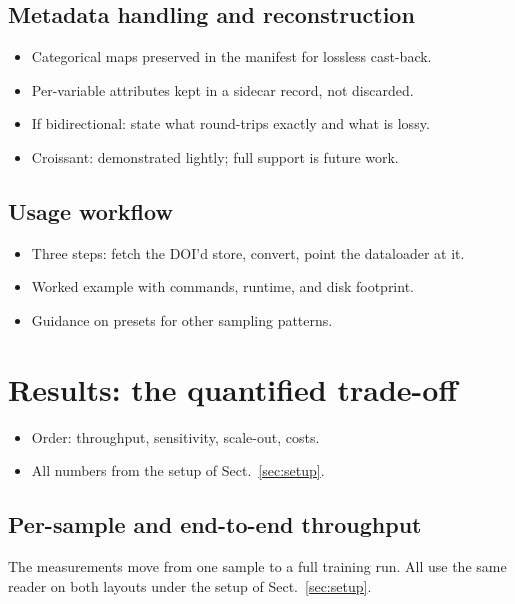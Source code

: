 \documentclass[gmd, manuscript]{copernicus}
\begin{document}
\subsection{Metadata handling and reconstruction}
\begin{itemize}
\item Categorical maps preserved in the manifest for lossless cast-back.
\item Per-variable attributes kept in a sidecar record, not discarded.
\item If bidirectional: state what round-trips exactly and what is lossy.
\item Croissant: demonstrated lightly; full support is future work.
\end{itemize}
\subsection{Usage workflow}
\begin{itemize}
\item Three steps: fetch the DOI'd store, convert, point the dataloader at it.
\item Worked example with commands, runtime, and disk footprint.
\item Guidance on presets for other sampling patterns.
\end{itemize}

\section{Results: the quantified trade-off}
\label{sec:results}
\begin{itemize}
\item Order: throughput, sensitivity, scale-out, costs.
\item All numbers from the setup of Sect.~\ref{sec:setup}.
\end{itemize}

\subsection{Per-sample and end-to-end throughput}
\label{sec:throughput}

The measurements move from one sample to a full training run. All use the same reader on both
layouts under the setup of Sect.~\ref{sec:setup}.
\end{document}
